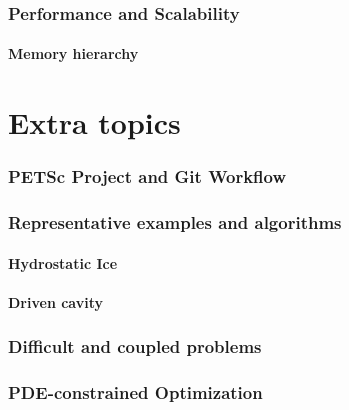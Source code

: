 \documentclass{beamer}
\begin{document}
\section{Performance and Scalability}



\subsection{Memory hierarchy}







%

\part{Extra topics}
\section{PETSc Project and Git Workflow}

\section{Representative examples and algorithms}
\subsection{Hydrostatic Ice}

\subsection{Driven cavity}



\section{Difficult and coupled problems}






\section{PDE-constrained Optimization}

\end{document}
